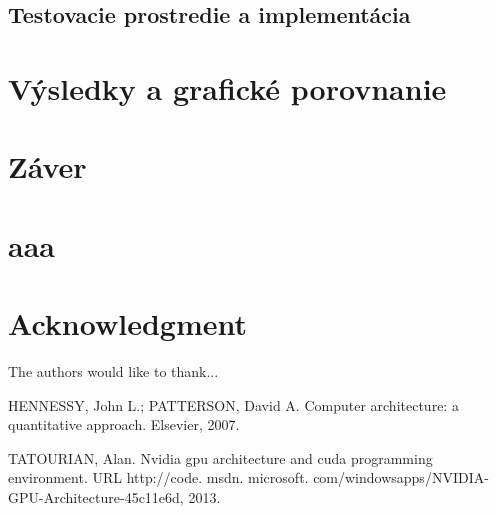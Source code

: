 \documentclass[conference]{IEEEtran}
\begin{document}
\subsection{Testovacie prostredie a implementácia}

\section{Výsledky a grafické porovnanie}

\section{Záver}


\appendices
\section{aaa}



\section*{Acknowledgment}


The authors would like to thank...


\ifCLASSOPTIONcaptionsoff
  \newpage
\fi




\begin{thebibliography}{1}

HENNESSY, John L.; PATTERSON, David A. Computer architecture: a quantitative approach. Elsevier, 2007.

TATOURIAN, Alan. Nvidia gpu architecture and cuda programming environment. URL http://code. msdn. microsoft. com/windowsapps/NVIDIA-GPU-Architecture-45c11e6d, 2013.

\end{thebibliography}
\end{document}
